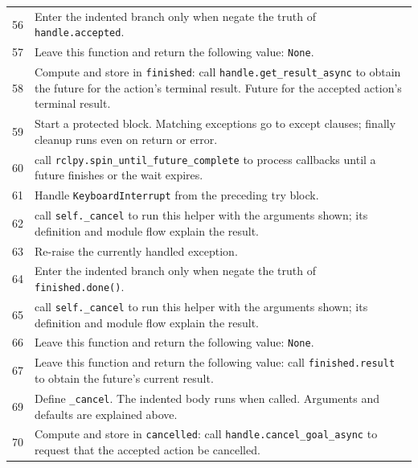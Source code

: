 \documentclass[11pt,a4paper]{book}
\begin{document}
\begin{longtable}{r p{}}
56 & Enter the indented branch only when negate the truth of \texttt{handle.accepted}. \\

57 & Leave this function and return the following value: \texttt{None}. \\

58 & Compute and store in \texttt{finished}: call \texttt{handle.get\_result\_async} to obtain the future for the action's terminal result. Future for the accepted action's terminal result. \\

59 & Start a protected block. Matching exceptions go to except clauses; finally cleanup runs even on return or error. \\

60 & call \texttt{rclpy.spin\_until\_future\_complete} to process callbacks until a future finishes or the wait expires. \\

61 & Handle \texttt{KeyboardInterrupt} from the preceding try block. \\

62 & call \texttt{self.\_cancel} to run this helper with the arguments shown; its definition and module flow explain the result. \\

63 & Re-raise the currently handled exception. \\

64 & Enter the indented branch only when negate the truth of \texttt{finished.done()}. \\

65 & call \texttt{self.\_cancel} to run this helper with the arguments shown; its definition and module flow explain the result. \\

66 & Leave this function and return the following value: \texttt{None}. \\

67 & Leave this function and return the following value: call \texttt{finished.result} to obtain the future's current result. \\

69 & Define \texttt{\_cancel}. The indented body runs when called. Arguments and defaults are explained above. \\

70 & Compute and store in \texttt{cancelled}: call \texttt{handle.cancel\_goal\_async} to request that the accepted action be cancelled.  \\


\end{longtable}
\end{document}
